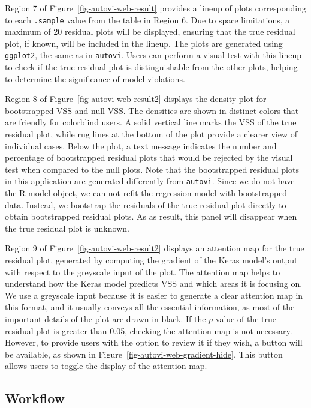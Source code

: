 \documentclass[
doublespace,
  times]{anzsauth}
\begin{document}
Region 7 of Figure~\ref{fig-autovi-web-result} provides a lineup of
plots corresponding to each \texttt{.sample} value from the table in
Region 6. Due to space limitations, a maximum of 20 residual plots will
be displayed, ensuring that the true residual plot, if known, will be
included in the lineup. The plots are generated using \texttt{ggplot2},
the same as in \texttt{autovi}. Users can perform a visual test with
this lineup to check if the true residual plot is distinguishable from
the other plots, helping to determine the significance of model
violations.

Region 8 of Figure~\ref{fig-autovi-web-result2} displays the density
plot for bootstrapped VSS and null VSS. The densities are shown in
distinct colors that are friendly for colorblind users. A solid vertical
line marks the VSS of the true residual plot, while rug lines at the
bottom of the plot provide a clearer view of individual cases. Below the
plot, a text message indicates the number and percentage of bootstrapped
residual plots that would be rejected by the visual test when compared
to the null plots. Note that the bootstrapped residual plots in this
application are generated differently from \texttt{autovi}. Since we do
not have the R model object, we can not refit the regression model with
bootstrapped data. Instead, we bootstrap the residuals of the true
residual plot directly to obtain bootstrapped residual plots. As as
result, this panel will disappear when the true residual plot is
unknown.

Region 9 of Figure~\ref{fig-autovi-web-result2} displays an attention
map for the true residual plot, generated by computing the gradient of
the Keras model's output with respect to the greyscale input of the
plot. The attention map helps to understand how the Keras model predicts
VSS and which areas it is focusing on. We use a greyscale input because
it is easier to generate a clear attention map in this format, and it
usually conveys all the essential information, as most of the important
details of the plot are drawn in black. If the \(p\)-value of the true
residual plot is greater than 0.05, checking the attention map is not
necessary. However, to provide users with the option to review it if
they wish, a button will be available, as shown in
Figure~\ref{fig-autovi-web-gradient-hide}. This button allows users to
toggle the display of the attention map.

\subsection{Workflow}\label{sec-autovi-web-workflow}
\end{document}
